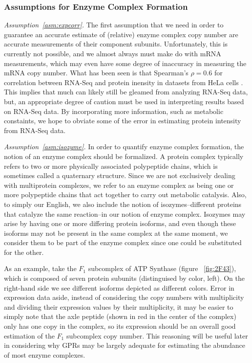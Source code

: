 \subsubsection{Assumptions for Enzyme Complex Formation}
\emph{Assumption~\ref{asm:expcorr}.}  The first assumption that we
need in order to guarantee an accurate estimate of (relative) enzyme
complex copy number are accurate measurements of their component
subunits. Unfortunately, this is currently not possible, and we almost
always must make do with mRNA measurements, which may even have some
degree of inaccuracy in measuring the mRNA copy number. What has been
seen is that Spearman's $\rho = 0.6$ for correlation between RNA-Seq
and protein inensity in datasets from HeLa cells
\citep{Nagaraj2011}. This implies that much can likely still be
gleamed from analyzing RNA-Seq data, but, an appropriate degree of
caution must be used in interpreting results based on RNA-Seq data. By
incorporating more information, such as metabolic constaints, we hope
to obviate some of the error in estimating protein intensity from
RNA-Seq data.

\emph{Assumption~\ref{asm:isozyme}.}  In order to quantify enzyme
complex formation, the notion of an enzyme complex should be
formalized.  A protein complex typically refers to two or more
physically associated polypeptide chains, which is sometimes called a
quaternary structure. Since we are not exclusively dealing with
multiprotein complexes, we refer to an enzyme complex as being one or
more polypeptide chains that act together to carry out metabolic
catalysis. Also, to simply our English, we also include the notion of
isozymes--different proteins that catalyze the same reaction--in our
notion of enzyme complex. Isozymes may arise by having one or more
differing protein isoforms, and even though these isoforms may not be
present in the same complex at the same moment, we consider them to be
part of the enzyme complex since one could be substituted for the
other.

As an example, take the $F_1$ subcomplex of ATP Synthase (figure
~\ref{fig:2F43}), which is composed of seven protein subunits
(distinguised by color, left). On the right-hand side we see different
isoforms depicted as different colors.  Error in expression data
aside, instead of considering the copy numbers with multiplicity and
dividing their expression values by their multiplicity, it may be
easier to simply note that the axle peptide (shown in red in the
center of the complex) only has one copy in the complex, so its
expression should be an overall good estimation of the $F_1$
subcomplex copy number. This reasoning will be useful later in
considering why GPRs may be largely adequate for estimating the
abundance of most enzyme complexes.

